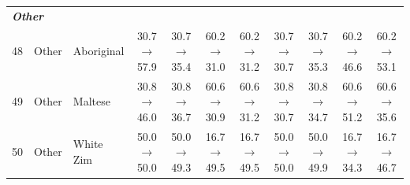 \begin{table}[t]
{\begin{tabular}{rll c c c c c c c c}
\midrule
\multicolumn{11}{l}{\textit{\textbf{Other}}} \\
48 & Other & Aboriginal & 30.7$\rightarrow$57.9 & 30.7$\rightarrow$35.4 & 60.2$\rightarrow$31.0 & 60.2$\rightarrow$31.2 & 30.7$\rightarrow$30.7 & 30.7$\rightarrow$35.3 & 60.2$\rightarrow$46.6 & 60.2$\rightarrow$53.1 \\
49 & Other & Maltese & 30.8$\rightarrow$46.0 & 30.8$\rightarrow$36.7 & 60.6$\rightarrow$30.9 & 60.6$\rightarrow$31.2 & 30.8$\rightarrow$30.7 & 30.8$\rightarrow$34.7 & 60.6$\rightarrow$51.2 & 60.6$\rightarrow$35.6 \\
50 & Other & White Zim & 50.0$\rightarrow$50.0 & 50.0$\rightarrow$49.3 & 16.7$\rightarrow$49.5 & 16.7$\rightarrow$49.5 & 50.0$\rightarrow$50.0 & 50.0$\rightarrow$49.9 & 16.7$\rightarrow$34.3 & 16.7$\rightarrow$46.7 \\
\bottomrule
\end{tabular}
}
\end{table}